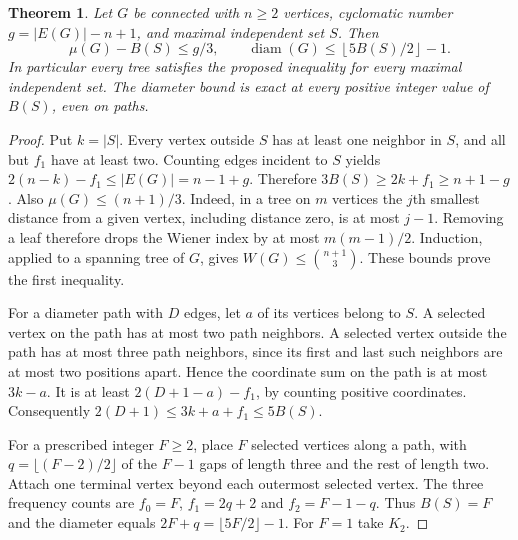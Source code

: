 \documentclass[11pt,a4paper]{article}
\newtheorem{theorem}{Theorem}[section]
\theoremstyle{remark}\newtheorem*{remark}{Remark}
\begin{document}
\begin{theorem}\label{thm:ninety-positive}
Let $G$ be connected with $n\ge2$ vertices, cyclomatic number
$g=|E(G)|-n+1$, and maximal independent set $S$. Then
\[
 \mu(G)-B(S)\le g/3,\qquad
 \operatorname{diam}(G)\le \left\lfloor 5B(S)/2\right\rfloor-1.
\]
In particular every tree satisfies the proposed inequality for every
maximal independent set. The diameter bound is exact at every positive
integer value of $B(S)$, even on paths.
\end{theorem}
\begin{proof}
Put $k=|S|$. Every vertex outside $S$ has at least one neighbor in
$S$, and all but $f_1$ have at least two. Counting edges incident to $S$ yields
$2(n-k)-f_1\le |E(G)|=n-1+g$. Therefore
$3B(S)\ge 2k+f_1\ge n+1-g$. Also $\mu(G)\le(n+1)/3$.
Indeed, in a tree on $m$ vertices the $j$th smallest distance from a
given vertex, including distance zero, is at most $j-1$.
Removing a leaf therefore drops the Wiener index by at most
$m(m-1)/2$. Induction, applied to a spanning tree of $G$, gives
$W(G)\le\binom{n+1}{3}$. These bounds prove the first inequality.

For a diameter path with $D$ edges, let $a$ of its vertices belong
to $S$. A selected vertex on the path has at most two path neighbors.
A selected vertex outside the path has at most three path neighbors,
since its first and last such neighbors are at most two positions apart.
Hence the coordinate sum on the path is at most $3k-a$.
It is at least $2(D+1-a)-f_1$, by counting positive coordinates.
Consequently $2(D+1)\le3k+a+f_1\le5B(S)$.

For a prescribed integer $F\ge2$, place $F$ selected vertices along a path,
with $q=\lfloor(F-2)/2\rfloor$ of the $F-1$ gaps of length three
and the rest of length two. Attach one terminal vertex beyond each
outermost selected vertex. The three frequency counts are
$f_0=F$, $f_1=2q+2$ and $f_2=F-1-q$.
Thus $B(S)=F$ and the diameter equals
$2F+q=\lfloor 5F/2\rfloor-1$. For $F=1$ take $K_2$.
\end{proof}
\end{document}

